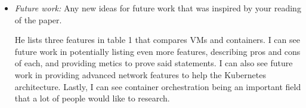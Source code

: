 \documentclass[letterpaper,twocolumn,10pt]{article}
\begin{document}
\begin{itemize}
\item {\it Future work:} Any new ideas for future work that was inspired by
your reading of the paper.

He lists three features in table 1 that compares VMs and containers. I can see future work in potentially listing even more 
features, describing pros and cons of each, and providing metics to prove said statements. I can also see future work in 
providing advanced network features to help the Kubernetes architecture. Lastly, I can see container orchestration being an
important field that a lot of people would like to research.   

\end{itemize}

{
  \small 
  
  
}
\end{document}
